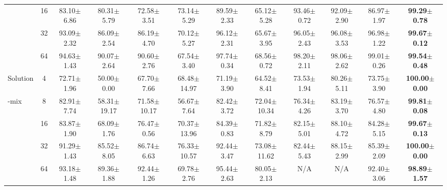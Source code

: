 \documentclass{article}
\theoremstyle{plain}
\theoremstyle{definition}
\theoremstyle{remark}
\begin{document}
\begin{table}[h!]
{\begin{tabular}{@{}lccccccccccc@{}}
 & 16 & 83.10$\pm$6.86 & 80.31$\pm$5.79 & 72.58$\pm$3.51 & 73.14$\pm$5.29 & 89.59$\pm$2.33 & 65.12$\pm$5.28 & 93.46$\pm$0.72 & 92.09$\pm$2.90 & 86.97$\pm$1.97 & \textbf{99.29$\pm$0.78} \\
 & 32 & 93.09$\pm$2.32 & 86.09$\pm$2.54 & 86.19$\pm$4.70 & 70.12$\pm$5.27 & 96.12$\pm$2.31 & 65.67$\pm$3.95 & 96.05$\pm$2.43 & 96.08$\pm$3.53 & 96.98$\pm$1.22 & \textbf{99.67$\pm$0.12} \\
 & 64 & 94.63$\pm$1.43 & 90.07$\pm$2.64 & 90.60$\pm$2.76 & 67.54$\pm$3.40 & 97.74$\pm$0.34 & 68.56$\pm$0.72 & 98.20$\pm$2.11 & 98.06$\pm$2.62 & 99.01$\pm$0.26 & \textbf{99.54$\pm$0.48} \\ \hline
Solution & 4 & 72.71$\pm$1.96 & 50.00$\pm$0.00 & 67.70$\pm$7.66 & 68.48$\pm$14.97 & 71.19$\pm$3.90 & 64.52$\pm$8.41 & 73.53$\pm$1.94 & 80.26$\pm$5.11 & 73.75$\pm$3.90 & \textbf{100.00$\pm$0.00} \\
-mix & 8 & 82.91$\pm$7.74 & 58.31$\pm$19.17 & 71.58$\pm$10.17 & 56.67$\pm$7.64 & 82.42$\pm$3.72 & 72.04$\pm$10.34 & 76.34$\pm$4.26 & 83.19$\pm$3.70 & 76.57$\pm$4.80 & \textbf{99.81$\pm$0.08} \\
 & 16 & 83.87$\pm$1.90 & 68.09$\pm$1.76 & 76.47$\pm$0.56 & 70.37$\pm$13.96 & 84.39$\pm$0.83 & 71.82$\pm$8.79 & 82.15$\pm$5.01 & 88.10$\pm$4.72 & 84.28$\pm$5.15 & \textbf{99.67$\pm$0.13} \\
 & 32 & 91.29$\pm$1.43 & 85.52$\pm$8.05 & 86.74$\pm$6.63 & 76.33$\pm$10.57 & 92.44$\pm$3.47 & 73.08$\pm$11.62 & 82.44$\pm$5.43 & 88.15$\pm$2.99 & 85.39$\pm$2.09 & \textbf{100.00$\pm$0.00} \\
 & 64 & 93.18$\pm$1.48 & 89.36$\pm$1.88 & 92.44$\pm$1.26 & 69.78$\pm$2.76 & 95.44$\pm$2.63 & 80.05$\pm$2.13 & N/A & N/A & 92.40$\pm$3.06 & \textbf{98.89$\pm$1.57} \\ \bottomrule
\end{tabular}}
\end{table}

\newpage
\end{document}

